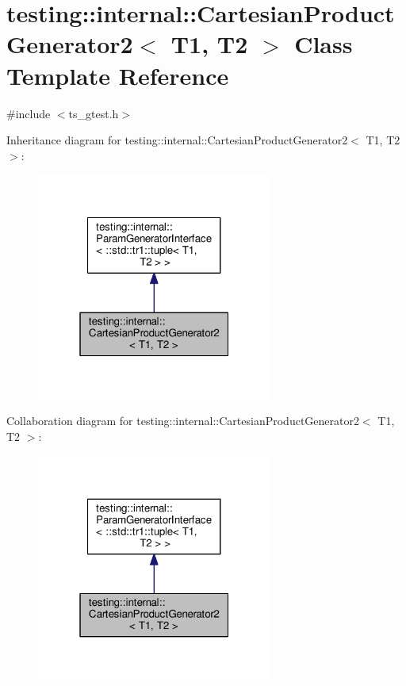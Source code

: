 \hypertarget{classtesting_1_1internal_1_1CartesianProductGenerator2}{\section{testing\-:\-:internal\-:\-:Cartesian\-Product\-Generator2$<$ T1, T2 $>$ Class Template Reference}
\label{classtesting_1_1internal_1_1CartesianProductGenerator2}
}


{\ttfamily \#include $<$ts\-\_\-gtest.\-h$>$}



Inheritance diagram for testing\-:\-:internal\-:\-:Cartesian\-Product\-Generator2$<$ T1, T2 $>$\-:\nopagebreak
\begin{figure}[H]
\begin{center}
\leavevmode
\includegraphics[width=220pt]{classtesting_1_1internal_1_1CartesianProductGenerator2__inherit__graph}
\end{center}
\end{figure}


Collaboration diagram for testing\-:\-:internal\-:\-:Cartesian\-Product\-Generator2$<$ T1, T2 $>$\-:\nopagebreak
\begin{figure}[H]
\begin{center}
\leavevmode
\includegraphics[width=220pt]{classtesting_1_1internal_1_1CartesianProductGenerator2__coll__graph}
\end{center}
\end{figure}
